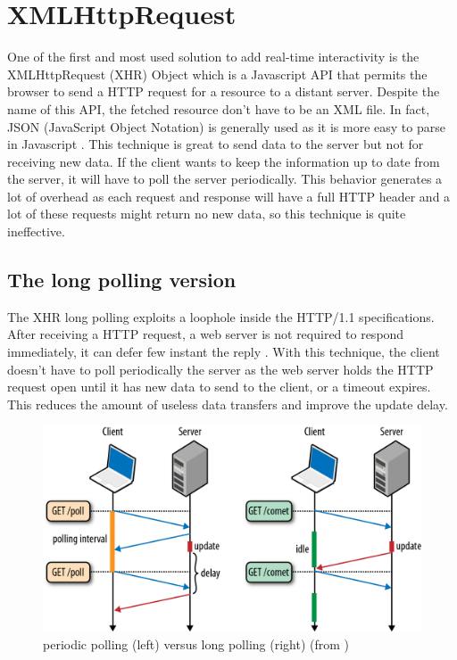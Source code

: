 \documentclass[10pt,journal,compsoc]{IEEEtran}
\begin{document}
\section{XMLHttpRequest}

One of the first and most used solution to add real-time interactivity is the XMLHttpRequest (XHR) Object which is a Javascript API that permits the browser to send a HTTP request for a resource to a distant server.
Despite the name of this API, the fetched resource don't have to be an XML file.
In fact, JSON (JavaScript Object Notation) is generally used as it is more easy to parse in Javascript \cite{collinalatency}.
This technique is great to send data to the server but not for receiving new data.
If the client wants to keep the information up to date from the server, it will have to poll the server periodically.
This behavior generates a lot of overhead as each request and response will have a full HTTP header and a lot of these requests might return no new data, so this technique is quite ineffective.

\subsection{The long polling version}

The XHR long polling exploits a loophole inside the \mbox{HTTP/1.1} specifications.
After receiving a HTTP request, a web server is not required to respond immediately, it can defer few instant the reply \cite{collinalatency}.
With this technique, the client doesn't have to poll periodically the server as the web server holds the HTTP request open until it has new data to send to the client, or a timeout expires.
This reduces the amount of useless data transfers and improve the update delay.

\begin{figure}[!ht]
  \centering
  \includegraphics[width=\linewidth]{poll_vs_lpoll}
  \caption{periodic polling (left) versus long polling (right) (from \cite{HighPerfBrowserNetworking:polling})}
  \label{poll_vs_lpoll}
\end{figure}
\end{document}
